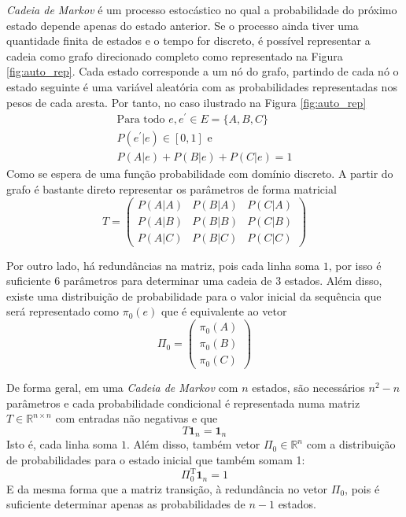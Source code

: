 \documentclass{subfiles}
\begin{document}
\textit{Cadeia de Markov} é um processo estocástico no qual a probabilidade do próximo estado depende apenas do estado anterior. Se o processo ainda tiver uma quantidade finita de estados e o tempo for discreto, é possível representar a cadeia como grafo direcionado completo como representado na Figura \ref{fig:auto_rep}. Cada estado corresponde a um nó do grafo, partindo de cada nó o estado seguinte é uma variável aleatória com as probabilidades representadas nos pesos de cada aresta. Por tanto, no caso ilustrado na Figura \ref{fig:auto_rep}
\begin{gather*}
	\text{Para todo } e, e^\prime \in E = \{A, B, C\} \\
	P(e^\prime|e) \in [0, 1] \text{ e }\\
	P(A|e) + P(B|e) + P(C|e) = 1
\end{gather*}
Como se espera de uma função probabilidade com domínio discreto. A partir do grafo é bastante direto representar os parâmetros de forma matricial
\[
    T = \begin{pmatrix}
        P(A|A) & P(B|A) & P(C|A) \\
        P(A|B) & P(B|B) & P(C|B) \\
        P(A|C) & P(B|C) & P(C|C)
    \end{pmatrix}
\]

Por outro lado, há redundâncias na matriz, pois cada linha soma $1$, por isso é suficiente $6$ parâmetros para determinar uma cadeia de $3$ estados. Além disso, existe uma distribuição de probabilidade para o valor inicial da sequência que será representado como $\pi_0(e)$ que é equivalente ao vetor
\[
	\Pi_0 = \begin{pmatrix}
		\pi_0(A) \\
		\pi_0(B) \\
		\pi_0(C)
	\end{pmatrix}
\]

De forma geral, em uma \textit{Cadeia de Markov} com $n$ estados, são necessários $n^2 - n$ parâmetros e cada probabilidade condicional é representada numa matriz $T \in \mathbb{R}^{n \times n}$ com entradas não negativas e que
\[
	T \mathbf{1}_n = \mathbf{1}_n
\]
Isto é, cada linha soma $1$. Além disso, também vetor $\Pi_0 \in \mathbb{R}^n$ com a distribuição de probabilidades para o estado inicial que também somam 1:
\[
	\Pi_0^{\mathrm T} \mathbf{1}_n = 1
\]
E da mesma forma que a matriz transição, à redundância no vetor $\Pi_0$, pois é suficiente determinar apenas as probabilidades de $n-1$ estados.
\end{document}

